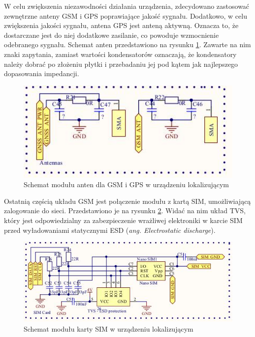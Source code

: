 W celu zwiększenia niezawodności działania urządzenia, zdecydowano zastosować zewnętrzne anteny GSM i GPS poprawiające jakość sygnału. Dodatkowo, w celu zwiększenia jakości sygnału, antena GPS jest anteną aktywną. Oznacza to, że dostarczane jest do niej dodatkowe zasilanie, co powoduje wzmocnienie odebranego sygnału. Schemat anten przedstawiono na rysunku \ref{fig:image_mainboard_functional_gps_gsm_antennas}. Zawarte na nim znaki zapytania, zamiast wartości kondensatorów oznaczają, że kondensatory należy dobrać po złożeniu płytki i przebadaniu jej pod kątem jak najlepszego dopasowania impedancji.

\begin{figure}[H]
	\centering
	\includegraphics[width=15cm]{img/schematics/mainboard_functional_gps_gsm_antennas.jpg}
	\caption{Schemat modułu anten dla GSM i GPS w urządzeniu lokalizującym}
	\label{fig:image_mainboard_functional_gps_gsm_antennas}
\end{figure}

Ostatnią częścią układu GSM jest połączenie modułu z kartą SIM, umożliwiającą zalogowanie do sieci. Przedstawiono je na rysunku \ref{fig:image_mainboard_functional_gsm_sim_card}. Widać na nim układ TVS, który jest odpowiedzialny za zabezpieczenie wrażliwej elektroniki w karcie SIM przed wyładowaniami statycznymi ESD (\textit{ang. Electrostatic discharge}).

\begin{figure}[H]
	\centering
	\includegraphics[width=15cm]{img/schematics/mainboard_gsm_sim_card.jpg}
	\caption{Schemat modułu karty SIM w urządzeniu lokalizującym}
	\label{fig:image_mainboard_functional_gsm_sim_card}
\end{figure}

